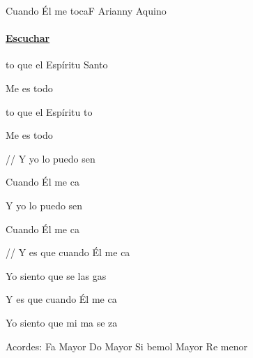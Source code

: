 \documentclass[12pt, spanish]{book}
\begin{document}
    \begin{song}{Cuando Él me toca}{F}
        {} %
        {Arianny Aquino}
        {} %
        {}
        \ifChordBk
        \paragraph{\mbox{}\hfill\protect\href{https://open.spotify.com/intl-es/track/12KDQL0UWhxroavdytpI0a}{Escuchar}\mbox{}\hfill}
        \fi


        \begin{SBOpGroup}
            to que el Espíritu Santo

            Me es todo

            to que el Espíritu to

            Me es todo
        \end{SBOpGroup}

        \begin{SBChorus}
            // Y yo lo puedo sen

            Cuando Él me ca

            Y yo lo puedo sen

            Cuando Él me ca
        \end{SBChorus}

        \begin{SBOpGroup}
            // Y es que cuando Él me ca

            Yo siento que se  las gas

            Y es que cuando Él me ca

            Yo siento que mi ma se za
        \end{SBOpGroup}

        \ifChordBk
        \begin{SBOpGroup}
            Acordes:
            \upchord{\F}\qquad Fa Mayor \hfill
            \upchord{\C}\qquad Do Mayor \hfill\null\break
            \upchord{\Bflat}\qquad Si bemol Mayor \hfill
            \upchord{\Dm}Re menor \hfill\null\break
        \end{SBOpGroup}
        \fi
    \end{song}
\end{document}
